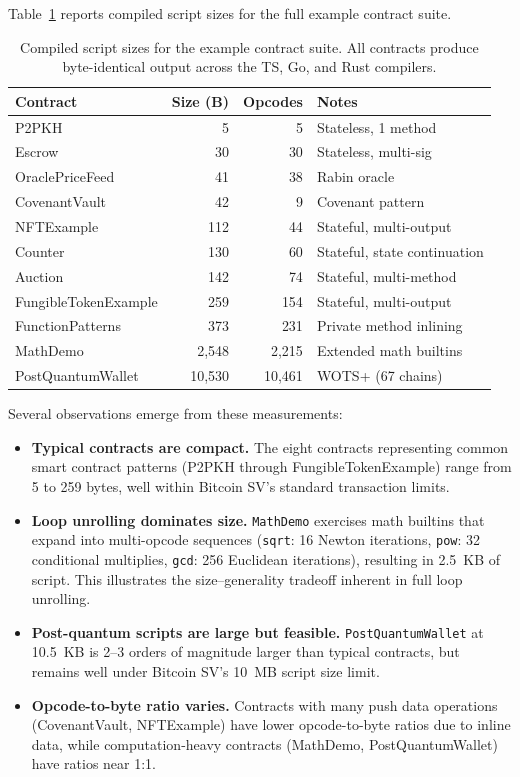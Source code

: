 \documentclass[11pt,a4paper]{article}
\begin{document}
Table~\ref{tab:sizes} reports compiled script sizes for the full example
contract suite.

\begin{table}[h]
\centering
\small
\begin{tabular}{@{}lrrl@{}}
\toprule
\textbf{Contract} & \textbf{Size (B)} & \textbf{Opcodes} & \textbf{Notes} \\
\midrule
P2PKH & 5 & 5 & Stateless, 1 method \\
Escrow & 30 & 30 & Stateless, multi-sig \\
OraclePriceFeed & 41 & 38 & Rabin oracle \\
CovenantVault & 42 & 9 & Covenant pattern \\
NFTExample & 112 & 44 & Stateful, multi-output \\
Counter & 130 & 60 & Stateful, state continuation \\
Auction & 142 & 74 & Stateful, multi-method \\
FungibleTokenExample & 259 & 154 & Stateful, multi-output \\
FunctionPatterns & 373 & 231 & Private method inlining \\
MathDemo & 2,548 & 2,215 & Extended math builtins \\
PostQuantumWallet & 10,530 & 10,461 & WOTS+ (67 chains) \\
\bottomrule
\end{tabular}
\caption{Compiled script sizes for the example contract suite.
  All contracts produce byte-identical output across the TS, Go, and
  Rust compilers.}
\label{tab:sizes}
\end{table}

Several observations emerge from these measurements:

\begin{itemize}[nosep]
  \item \textbf{Typical contracts are compact.} The eight contracts
    representing common smart contract patterns (P2PKH through
    FungibleTokenExample) range from 5 to 259 bytes, well within
    Bitcoin SV's standard transaction limits.
  \item \textbf{Loop unrolling dominates size.} \texttt{MathDemo}
    exercises math builtins that expand into multi-opcode sequences
    (\texttt{sqrt}: 16 Newton iterations, \texttt{pow}: 32 conditional
    multiplies, \texttt{gcd}: 256 Euclidean iterations), resulting in
    2.5~KB of script. This illustrates the size--generality tradeoff
    inherent in full loop unrolling.
  \item \textbf{Post-quantum scripts are large but feasible.}
    \texttt{PostQuantumWallet} at 10.5~KB is 2--3 orders of magnitude
    larger than typical contracts, but remains well under Bitcoin SV's
    10~MB script size limit.
  \item \textbf{Opcode-to-byte ratio varies.} Contracts with many push
    data operations (CovenantVault, NFTExample) have lower opcode-to-byte
    ratios due to inline data, while computation-heavy contracts
    (MathDemo, PostQuantumWallet) have ratios near 1:1.
\end{itemize}
\end{document}
